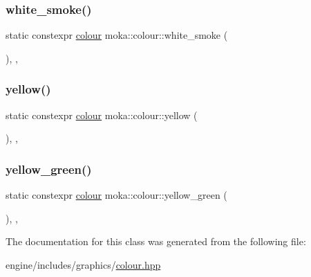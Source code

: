 \mbox{\label{classmoka_1_1colour_ae9bfa45ce6e6417ffb19b11c7461aa7d}} 
\subsubsection{\texorpdfstring{white\_smoke()}{white\_smoke()}}
{\footnotesize\ttfamily static constexpr \mbox{\hyperlink{classmoka_1_1colour}{colour}} moka\+::colour\+::white\+\_\+smoke (\begin{DoxyParamCaption}{ }\end{DoxyParamCaption})\hspace{0.3cm}{\ttfamily [inline]}, {\ttfamily [static]}, {\ttfamily [noexcept]}}

\mbox{\label{classmoka_1_1colour_a0f1203d05495c876fd24160e9b5a3de2}} 
\subsubsection{\texorpdfstring{yellow()}{yellow()}}
{\footnotesize\ttfamily static constexpr \mbox{\hyperlink{classmoka_1_1colour}{colour}} moka\+::colour\+::yellow (\begin{DoxyParamCaption}{ }\end{DoxyParamCaption})\hspace{0.3cm}{\ttfamily [inline]}, {\ttfamily [static]}, {\ttfamily [noexcept]}}

\mbox{\label{classmoka_1_1colour_ab108e0b2bf391a04c825c9612a48c998}} 
\subsubsection{\texorpdfstring{yellow\_green()}{yellow\_green()}}
{\footnotesize\ttfamily static constexpr \mbox{\hyperlink{classmoka_1_1colour}{colour}} moka\+::colour\+::yellow\+\_\+green (\begin{DoxyParamCaption}{ }\end{DoxyParamCaption})\hspace{0.3cm}{\ttfamily [inline]}, {\ttfamily [static]}, {\ttfamily [noexcept]}}



The documentation for this class was generated from the following file\+:\begin{DoxyCompactItemize}
\item 
engine/includes/graphics/\mbox{\hyperlink{colour_8hpp}{colour.\+hpp}}\end{DoxyCompactItemize}

